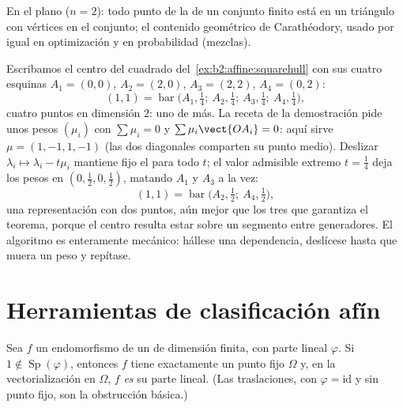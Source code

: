 \begin{example}
En el plano ($n = 2$): todo punto de la  de un
conjunto finito está en un triángulo con vértices en el conjunto; el
contenido geométrico de Carathéodory, usado por igual en optimización
y en probabilidad (mezclas).
\end{example}

\begin{example}\label{ex:b2:affine:caratheodoryrun}
Escribamos el centro del cuadrado del~\cref{ex:b2:affine:squarehull} con sus cuatro esquinas $A_1 =
(0,0)$, $A_2 = (2,0)$, $A_3 = (2,2)$, $A_4 = (0,2)$:
\[
(1,1) = \operatorname{bar}\bigl(A_1, \tfrac14;\ A_2,
\tfrac14;\ A_3, \tfrac14;\ A_4, \tfrac14\bigr),
\]
cuatro puntos en dimensión $2$: uno de más. La receta de la
demostración pide unos pesos $(\mu_i)$ con $\sum\mu_i = 0$ y
$\sum\mu_i\vect{OA_i} = 0$: aquí sirve $\mu = (1, -1, 1, -1)$ (las
dos diagonales comparten su punto medio). Deslizar $\lambda_i \mapsto
\lambda_i - t\mu_i$ mantiene fijo el  para todo $t$; el
valor admisible extremo $t = \frac14$ deja los pesos en $(0,
\tfrac12, 0, \tfrac12)$, matando $A_1$ y $A_3$ a la vez:
\[
(1,1) = \operatorname{bar}\bigl(A_2, \tfrac12;\ A_4,
\tfrac12\bigr),
\]
una representación con dos puntos, aún mejor que los tres que
garantiza el teorema, porque el centro resulta estar sobre un
segmento entre generadores. El algoritmo es enteramente mecánico:
hállese una dependencia, deslícese hasta que muera un peso y
repítase.
\end{example}

\section{Herramientas de clasificación afín}

\begin{proposition}\label{prop:b2:affine:fixedpoint}
Sea $f$ un endomorfismo  de un  de dimensión finita,
con parte lineal $\varphi$. Si $1 \notin
\operatorname{Sp}(\varphi)$, entonces $f$ tiene exactamente un punto
fijo $\Omega$ y, en la vectorialización en $\Omega$, $f$ \emph{es} su
parte lineal. (Las traslaciones, con $\varphi = \mathrm{id}$ y sin
punto fijo, son la obstrucción básica.)
\end{proposition}

